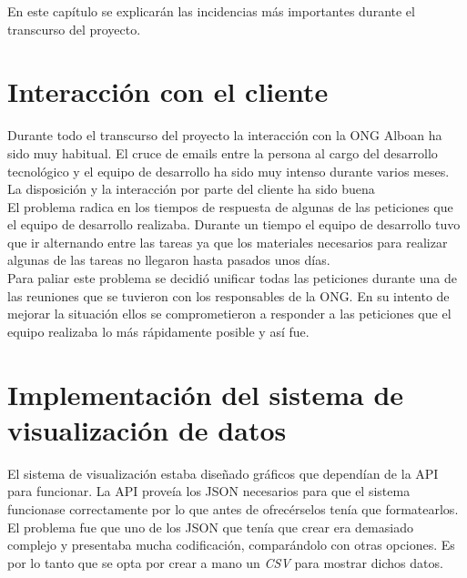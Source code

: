 En este capítulo se explicarán las incidencias más importantes durante el transcurso del proyecto.

\section{Interacción con el cliente}
Durante todo el transcurso del proyecto la interacción con la ONG Alboan ha sido muy habitual. El cruce de emails entre la persona al cargo del desarrollo tecnológico y el equipo de desarrollo ha sido muy intenso durante varios meses. La disposición y la interacción por parte del cliente ha sido buena\\

El problema radica en los tiempos de respuesta de algunas de las peticiones que el equipo de desarrollo realizaba. Durante un tiempo el equipo de desarrollo tuvo que ir alternando entre las tareas ya que los materiales necesarios para realizar algunas de las tareas no llegaron hasta pasados unos días.\\

Para paliar este problema se decidió unificar todas las peticiones durante una de las reuniones que se tuvieron con los responsables de la ONG. En su intento de mejorar la situación ellos se comprometieron a responder a las peticiones que el equipo realizaba lo más rápidamente posible y así fue.

\section{Implementación del sistema de visualización de datos}

El sistema de visualización estaba diseñado gráficos que dependían de la API para funcionar. La API proveía los JSON necesarios para que el sistema funcionase correctamente por lo que antes de ofrecérselos tenía que formatearlos.\\

El problema fue que uno de los JSON que tenía que crear era demasiado complejo y presentaba mucha codificación, comparándolo con otras opciones. Es por lo tanto que se opta por crear a mano un \textit{CSV} para mostrar dichos datos.

